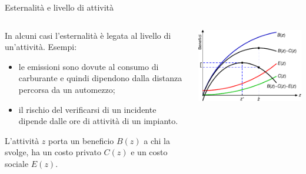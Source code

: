 \documentclass[aspectratio=64,12pt]{beamer}
\begin{document}
\begin{frame}{Esternalità e livello di attività}
\begin{columns}
\begin{column}{.5\columnwidth}
In alcuni casi l’esternalità è legata al livello di un'attività. Esempi:
\begin{itemize}
\item le emissioni sono dovute al consumo di carburante e quindi dipendono dalla distanza percorsa da un automezzo;
\item il rischio del verificarsi di un incidente dipende dalle ore di attività di un impianto.
\end{itemize}
L’attività $z$ porta un beneficio $B(z)$ a chi la svolge, ha un costo privato $C(z)$ e un costo sociale $E(z)$.
\end{column}
\begin{column}{.5\columnwidth}
\begin{center}
\includegraphics[width=\textwidth]{./figure/esternalita-1-color.pdf}
\end{center}
\end{column}
\end{columns}
\end{frame}
\end{document}
